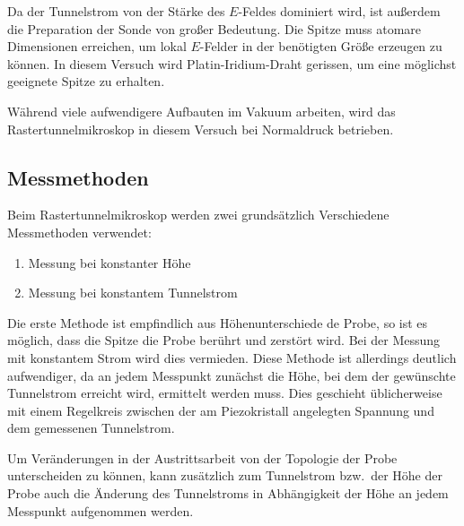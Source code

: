 Da der Tunnelstrom von der Stärke des $E$-Feldes dominiert wird,
ist außerdem die Preparation der Sonde von großer Bedeutung.
Die Spitze muss atomare Dimensionen erreichen, um lokal $E$-Felder in der benötigten Größe erzeugen zu können.
In diesem Versuch wird Platin-Iridium-Draht gerissen, um eine möglichst geeignete Spitze zu erhalten.

Während viele aufwendigere Aufbauten im Vakuum arbeiten, wird das Rastertunnelmikroskop in diesem Versuch bei Normaldruck betrieben.

\subsection{Messmethoden}

Beim Rastertunnelmikroskop werden zwei grundsätzlich Verschiedene Messmethoden verwendet:
\begin{enumerate}
  \item Messung bei konstanter Höhe
  \item Messung bei konstantem Tunnelstrom
\end{enumerate}

Die erste Methode ist empfindlich aus Höhenunterschiede de Probe, so ist es möglich, dass die Spitze die Probe berührt und zerstört wird.
Bei der Messung mit konstantem Strom wird dies vermieden. 
Diese Methode ist allerdings deutlich aufwendiger, da an jedem Messpunkt zunächst die Höhe, bei dem der gewünschte Tunnelstrom erreicht wird, ermittelt werden muss.
Dies geschieht üblicherweise mit einem Regelkreis zwischen der am Piezokristall angelegten Spannung und dem gemessenen Tunnelstrom.

Um Veränderungen in der Austrittsarbeit von der Topologie der Probe unterscheiden zu können, kann zusätzlich zum Tunnelstrom bzw.\ der Höhe der Probe auch die Änderung des Tunnelstroms in Abhängigkeit der Höhe an jedem Messpunkt aufgenommen werden.
